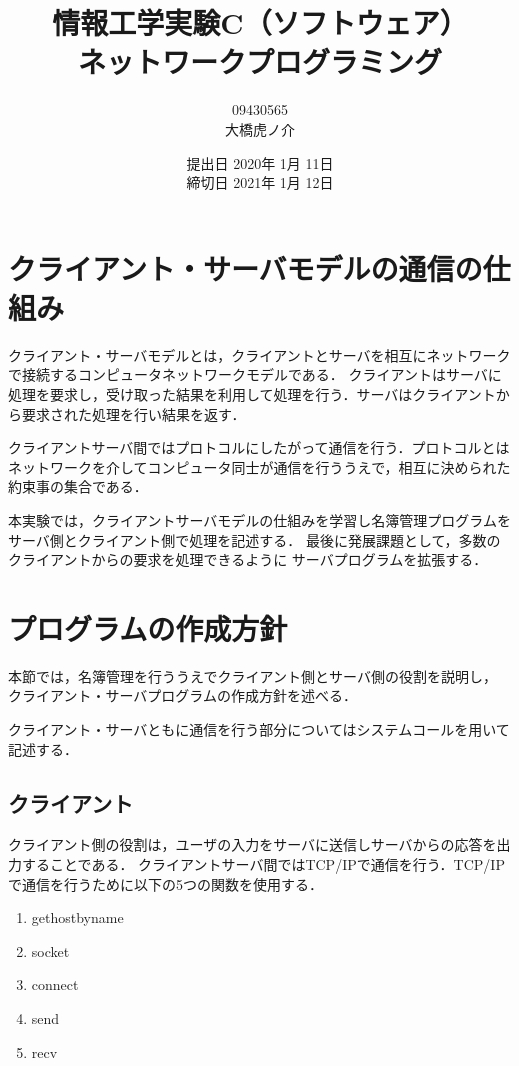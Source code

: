 \documentclass[11pt]{jarticle}
\begin{document}
\title{情報工学実験C（ソフトウェア）\\ネットワークプログラミング}
\author{09430565\\大橋虎ノ介}
\date{提出日 2020年 1月 11日\\
締切日 2021年  1月 12日}

\maketitle
\newpage

\section{クライアント・サーバモデルの通信の仕組み}

クライアント・サーバモデルとは，クライアントとサーバを相互にネットワークで接続するコンピュータネットワークモデルである．
クライアントはサーバに処理を要求し，受け取った結果を利用して処理を行う．サーバはクライアントから要求された処理を行い結果を返す．

クライアントサーバ間ではプロトコルにしたがって通信を行う．プロトコルとはネットワークを介してコンピュータ同士が通信を行ううえで，相互に決められた約束事の集合である．

本実験では，クライアントサーバモデルの仕組みを学習し名簿管理プログラムを
サーバ側とクライアント側で処理を記述する．
最後に発展課題として，多数のクライアントからの要求を処理できるように
サーバプログラムを拡張する．

\section{プログラムの作成方針}\label{sec:policy}

本節では，名簿管理を行ううえでクライアント側とサーバ側の役割を説明し，
クライアント・サーバプログラムの作成方針を述べる．

クライアント・サーバともに通信を行う部分についてはシステムコールを用いて記述する．

\subsection{クライアント} \label{sec:client_policy}

クライアント側の役割は，ユーザの入力をサーバに送信しサーバからの応答を出力することである．
クライアントサーバ間ではTCP/IPで通信を行う．TCP/IPで通信を行うために以下の5つの関数を使用する．


\begin{enumerate}
    \item gethostbyname
    \item socket
    \item connect
    \item send
    \item recv
\end{enumerate}
\end{document}
